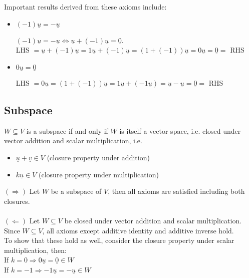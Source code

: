 \documentclass{article}
\begin{document}
Important results derived from these axioms include:
\begin{itemize}
	\item $(-1)\underline{u} = -\underline{u}$
	\begin{tcolorbox}[colback=lightgray!20, colframe=lightgray!20]
		$(-1)\underline{u} = -\underline{u} \iff \underline{u} + (-1)\underline{u} = \underline{0}$. \\
		LHS $= \underline{u} + (-1)\underline{u} = 1\underline{u} + (-1)\underline{u} = (1+(-1))\underline{u} = 0\underline{u} = \underline{0} =$ RHS
	\end{tcolorbox}
	\item $0\underline{u} = \underline{0}$
	\begin{tcolorbox}[colback=lightgray!20, colframe=lightgray!20]
		LHS $= 0\underline{u} = (1+(-1))\underline{u} = 1\underline{u} + (-1\underline{u}) = \underline{u} - \underline{u} = \underline{0} =$ RHS
	\end{tcolorbox}
\end{itemize}

\subsection{Subspace}

$W \subseteq V$ is a subspace if and only if $W$ is itself a vector space, i.e. closed under vector addition and scalar multiplication, i.e.
\begin{itemize}
	\item  $\underline{u} + \underline{v} \in V$ (closure property under addition)
	\item $k\underline{u} \in V$ (closure property under multiplication)
\end{itemize}
\begin{tcolorbox}[colback=lightgray!20, colframe=lightgray!20, fontupper=\linespread{1.25}\selectfont]
	$(\Rightarrow)$ Let $W$ be a subspace of $V$, then all axioms are satisfied including both closures. \\\\	
	$(\Leftarrow)$ Let $W \subseteq V$ be closed under vector addition and scalar multiplication. \\
	Since $W \subseteq V$, all axioms except additive identity and additive inverse hold. \\
	To show that these hold as well, consider the closure property under scalar multiplication, then: \\
	If $k=0 \Rightarrow 0\underline{u} = \underline{0} \in W$ \\
	If $k=-1 \Rightarrow -1\underline{u} = -\underline{u} \in W$	
\end{tcolorbox}
\end{document}

